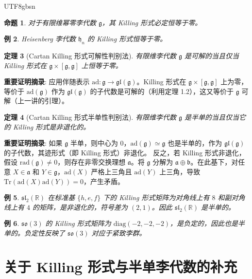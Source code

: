\documentclass[11pt]{article}
\newtheorem{theorem}{定理}[section]
\newtheorem{proposition}[theorem]{命题}
\newtheorem{example}[theorem]{例}
\begin{document}
\begin{CJK*}{UTF8}{gbsn}
\begin{proposition}
对于有限维幂零李代数 $\mathfrak{g}$，其 Killing 形式必定恒等于零。
\end{proposition}

\begin{example}
Heisenberg 李代数 $\mathfrak{h}_n$ 的 Killing 形式恒等于零。
\end{example}

\begin{theorem}[Cartan Killing 形式可解性判别法]
有限维李代数 $\mathfrak{g}$ 是可解的当且仅当 Killing 形式在 $\mathfrak{g} \times [\mathfrak{g}, \mathfrak{g}]$ 上恒等于零。
\end{theorem}
\textbf{重要证明摘录}:
应用伴随表示 $\mathrm{ad}: \mathfrak{g} \to \mathfrak{gl}(\mathfrak{g})$。Killing 形式在 $\mathfrak{g} \times [\mathfrak{g}, \mathfrak{g}]$ 上为零，等价于 $\mathrm{ad}(\mathfrak{g})$ 作为 $\mathfrak{gl}(\mathfrak{g})$ 的子代数是可解的（利用定理 1.2），这又等价于 $\mathfrak{g}$ 可解（上一讲的引理）。

\begin{theorem}[Cartan Killing 形式半单性判别法]
有限维李代数 $\mathfrak{g}$ 是半单的当且仅当它的 Killing 形式是非退化的。
\end{theorem}
\textbf{重要证明摘录}:
如果 $\mathfrak{g}$ 半单，则中心为 $0$，$\mathrm{ad}(\mathfrak{g}) \simeq \mathfrak{g}$ 也是半单的，作为 $\mathfrak{gl}(\mathfrak{g})$ 的子代数，其迹形式（即 Killing 形式）非退化。
反之，若 Killing 形式非退化，假设 $\mathrm{rad}(\mathfrak{g}) \neq 0$，则存在非零交换理想 $\mathfrak{a}$。将 $\mathfrak{g}$ 分解为 $\mathfrak{a} \oplus \mathfrak{b}$。在此基下，对任意 $X \in \mathfrak{a}$ 和 $Y \in \mathfrak{g}$，$\mathrm{ad}(X)$ 严格上三角且 $\mathrm{ad}(Y)$ 上三角，导致 $\mathrm{Tr}(\mathrm{ad}(X)\mathrm{ad}(Y)) = 0$，产生矛盾。

\begin{example}
$\mathfrak{sl}_2(\mathbb{R})$ 在标准基 $\{h, e, f\}$ 下的 Killing 形式矩阵为对角线上有 $8$ 和副对角线上有 $4$ 的矩阵，是非退化的，符号差为 $(2,1)$。因此 $\mathfrak{sl}_2(\mathbb{R})$ 是半单的。
\end{example}

\begin{example}
$\mathfrak{so}(3)$ 的 Killing 形式矩阵为 $\mathrm{diag}(-2,-2,-2)$，是负定的，因此也是半单的。负定性反映了 $\mathfrak{so}(3)$ 对应于紧致李群。
\end{example}

\section{关于 Killing 形式与半单李代数的补充}


\end{CJK*}
\end{document}
